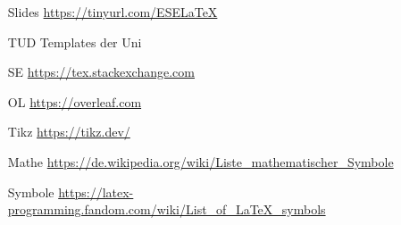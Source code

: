 \begin{frame}
\hspace{2em}
\begin{minipage}{.9\textwidth}
\begin{itemize}[<+->]
	\item[Slides] \url{https://tinyurl.com/ESELaTeX}
	\item[TUD] Templates der Uni
	\item[SE] \url{https://tex.stackexchange.com}
	\item[OL] \url{https://overleaf.com}
	\item[Tikz] \url{https://tikz.dev/}
	\item[Mathe] \url{https://de.wikipedia.org/wiki/Liste_mathematischer_Symbole}
	\item[Symbole] \url{https://latex-programming.fandom.com/wiki/List_of_LaTeX_symbols}
\end{itemize}
\end{minipage}
\end{frame}
